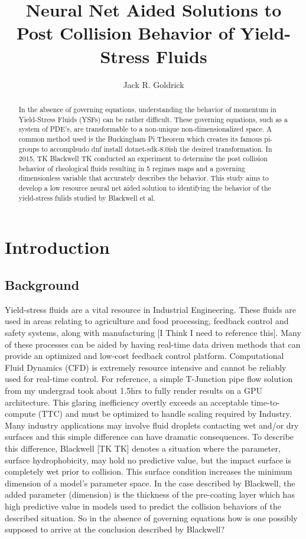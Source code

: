 \documentclass{article}
\title{Neural Net Aided Solutions to Post Collision Behavior of Yield-Stress Fluids}
\author{Jack R. Goldrick}
\begin{document}
\maketitle

\begin{abstract}
In the absence of governing equations, understanding the behavior of momentum in Yield-Stress Fluids (YSFs) can be rather difficult. These governing equations, such as a system of PDE's, are transformable to a non-unique non-dimensionalized space. A common method used is the Buckingham Pi Theorem which creates its famous pi-groups to accomplsudo dnf install dotnet-sdk-8.0ish the desired transformation. In 2015, TK Blackwell TK conducted an experiment to determine the post collision behavior of rheological fluids resulting in 5 regimes maps and a governing dimensionless variable that accurately describes the behavior. This study aims to develop a low resource neural net aided solution to identifying the behavior of the yield-stress fulids studied by Blackwell et al.

\end{abstract}

\section{Introduction}

\subsection{Background}

Yield-stress fluids are a vital resource in Industrial Engineering. These fluids are used in areas relating to agriculture and food processing, feedback control and safety systems, along with manufacturing [I Think I need to reference this].  Many of these processes can be aided by having real-time data driven methods that can provide an optimized and low-cost feedback control platform. Computational Fluid Dynamics (CFD) is extremely resource intensive and cannot be reliably used for real-time control. For reference, a simple T-Junction pipe flow solution from my undergrad took about 1.5hrs to fully render results on a GPU architecture.  This glaring inefficiency overtly exceeds an acceptable time-to-compute (TTC) and must be optimized to handle scaling required by Industry. Many industry applications may involve fluid droplets contacting wet and/or dry surfaces and this simple difference can have dramatic consequences. To describe this difference, Blackwell [TK TK] denotes a situation where the parameter, surface hydrophobicity, may hold no predictive value, but the impact surface is completely wet prior to collision. This surface condition increases the minimum dimension of a model's parameter space. In the case described by Blackwell, the added parameter (dimension) is the thickness of the pre-coating layer which has high predictive value in models used to predict the collision behaviors of the described situation. So in the absence of governing equations how is one possibly supposed to arrive at the conclusion described by Blackwell? 
\end{document}
